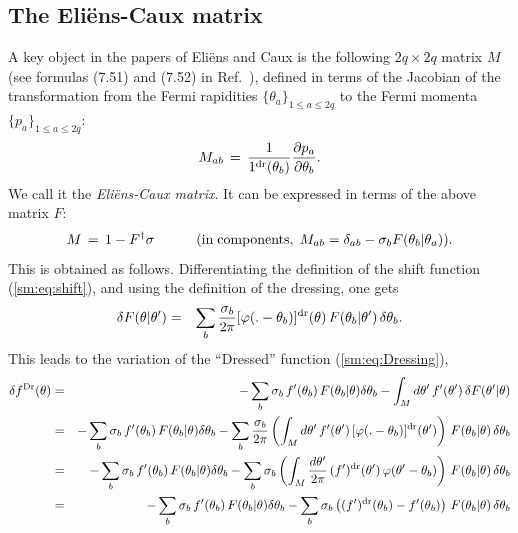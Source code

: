 \documentclass[twocolumn,amsfonts,showpacs,superscriptaddress]{revtex4-1}
\begin{document}
\begin{widetext}
\subsection{The Eli\"ens-Caux matrix}

A key object in the papers of Eli\"ens and Caux is the following $2q \times 2q$ matrix $M$ (see formulas (7.51) and (7.52) in Ref.~\cite{eliens2017quantum}), defined in terms of the Jacobian of the transformation from the Fermi rapidities $\{ \theta_a\}_{1 \leq a \leq 2q}$ to the Fermi momenta $\{ p_a\}_{1 \leq a \leq 2q}$:
\begin{equation}
	\label{sm:eq:EC}
	M_{ab} \, = \, \frac{1}{1^{\rm dr}(\theta_b)} \frac{\partial p_a}{ \partial \theta_b} .
\end{equation}
We call it the {\it Eli\"ens-Caux matrix}. It can be expressed in terms of the above matrix $F$:
\begin{equation}
	\label{sm:eq:VF}
	M \, = \, 1 - F^\dagger  \sigma \qquad \quad ({\rm in \; components}, \;M_{ab} = \delta_{ab} - \sigma_b F(\theta_b| \theta_a)) .
\end{equation}
This is obtained as follows. Differentiating the definition of the shift function (\ref{sm:eq:shift}), and using the definition of the dressing, one gets
\begin{eqnarray}
	\delta F(\theta | \theta') &=& \sum_b \frac{\sigma_b}{2\pi} [\varphi(. - \theta_b)]^{\rm dr}(\theta) \, F(\theta_b | \theta') \, \delta \theta_b .
\end{eqnarray}
This leads to the variation of the ``Dressed'' function (\ref{sm:eq:Dressing}),
\begin{eqnarray}
	\nonumber \delta f^{\rm Dr} (\theta ) &=& - \sum_b \sigma_b \, f'(\theta_b) \,  F(\theta_b | \theta) \delta \theta_b - \int_M d \theta' \, f'(\theta') \, \delta F(\theta' | \theta) \\
	\nonumber &=&  - \sum_b \sigma_b \, f'(\theta_b) \,  F(\theta_b | \theta) \delta \theta_b - \sum_b \frac{\sigma_b}{2\pi}  \left( \int_M d\theta' \, f'(\theta') \,[\varphi(. - \theta_b)]^{\rm dr}(\theta') \right) \, F(\theta_b | \theta) \, \delta \theta_b  \\
	\nonumber &=&  - \sum_b \sigma_b \, f'(\theta_b) \,  F(\theta_b | \theta) \delta \theta_b - \sum_b \sigma_b  \left( \int_M \frac{d\theta'}{2\pi} \, (f')^{\rm dr}(\theta') \,\varphi(\theta' - \theta_b) \right) \, F(\theta_b | \theta) \, \delta \theta_b  \\
	\nonumber &=&  - \sum_b \sigma_b \, f'(\theta_b) \,  F(\theta_b | \theta) \delta \theta_b - \sum_b \sigma_b  \left(  (f')^{\rm dr}(\theta_b) - f'(\theta_b) \right) \, F(\theta_b | \theta) \, \delta \theta_b  \\

\end{eqnarray}
\end{widetext}
\end{document}
